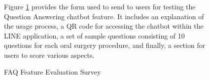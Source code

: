\documentclass[12pt,oneside,openright,a4paper]{cpe-english-project}
\begin{document}
\begin{figure}[H]
\begin{minipage}{0.3\textwidth}
          \end{minipage}
          \begin{minipage}{0.3\textwidth}
            \centering
          \end{minipage}
          \caption{FAQ Feature Evaluation Survey}\label{fig:FAQform}
          \begin{justify}
            \qquad Figure \ref{fig:FAQform} provides the form used to send to users for testing the Question Answering chatbot feature. It includes an explanation of the usage process, a QR code for accessing the chatbot within the LINE application, a set of sample questions consisting of 10 questions for each oral surgery procedure, and finally, a section for users to score various aspects.\par
          \end{justify}
        \end{figure}     
\end{document}
